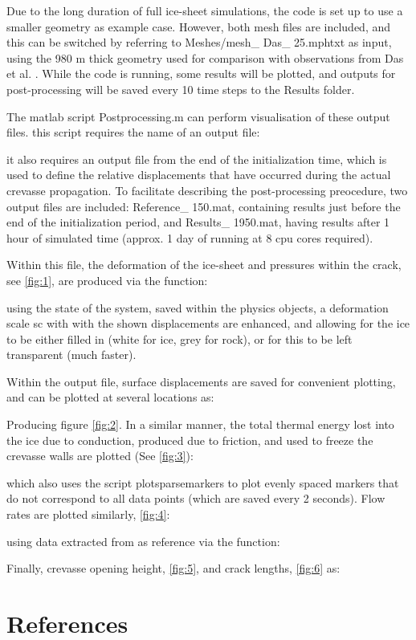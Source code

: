 \documentclass[3p]{elsarticle} %
\begin{document}
Due to the long duration of full ice-sheet simulations, the code is set up to use a smaller geometry as example case. However, both mesh files are included, and this can be switched by referring to Meshes/mesh\_ Das\_ 25.mphtxt as input, using the 980 m thick geometry used for comparison with observations from Das et al. \citep{Das2008}. While the code is running, some results will be plotted, and outputs for post-processing will be saved every 10 time steps to the Results folder. 

The matlab script Postprocessing.m can perform visualisation of these output files. this script requires the name of an output file:

it also requires an output file from the end of the initialization time, which is used to define the relative displacements that have occurred during the actual crevasse propagation. To facilitate describing the post-processing preocedure, two output files are included: Reference\_ 150.mat, containing results just before the end of the initialization period, and Results\_ 1950.mat, having results after 1 hour of simulated time (approx. 1 day of running at 8 cpu cores required). 

Within this file, the deformation of the ice-sheet and pressures within the crack, see \cref{fig:1}, are produced via the function:

using the state of the system, saved within the physics objects, a deformation scale sc with with the shown displacements are enhanced, and allowing for the ice to be either filled in (white for ice, grey for rock), or for this to be left transparent (much faster). 

Within the output file, surface displacements are saved for convenient plotting, and can be plotted at several locations as:

Producing figure \cref{fig:2}.
In a similar manner, the total thermal energy lost into the ice due to conduction, produced due to friction, and used to freeze the crevasse walls are plotted (See \cref{fig:3}):

which also uses the script plotsparsemarkers \citep{SparseMarkers} to plot evenly spaced markers that do not correspond to all data points (which are saved every 2 seconds). Flow rates are plotted similarly, \cref{fig:4}:


using data extracted from \citep{Das2008} as reference via the function:

Finally, crevasse opening height, \cref{fig:5}, and crack lengths, \cref{fig:6} as:







\section{References}
\renewcommand{\bibsection}{}

\end{document}
